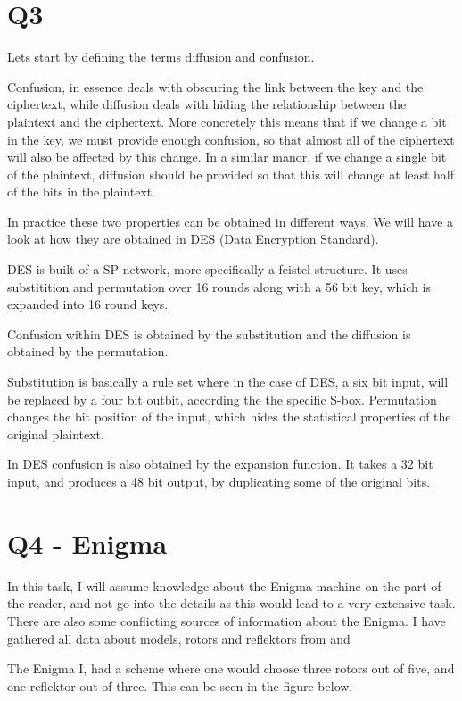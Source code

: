 \documentclass{article}
\begin{document}
\section{Q3}
Lets start by defining the terms diffusion and confusion.

Confusion, in essence deals with obscuring the link between the key and the ciphertext, while diffusion deals with hiding the relationship between the plaintext and the ciphertext. More concretely this means that if we change a bit in the key, we must provide enough confusion, so that almost all of the ciphertext will also be affected by this change. In a similar manor, if we change a single bit of the plaintext, diffusion should be provided so that this will change at least half of the bits in the plaintext. 

In practice these two properties can be obtained in different ways. We will have a look at how they are obtained in DES (Data Encryption Standard). 

DES is built of a SP-network, more specifically a feistel structure. It uses substitition and permutation over 16 rounds along with a 56 bit key, which is expanded into 16 round keys. 

Confusion within DES is obtained by the substitution and the diffusion is obtained by the permutation. 

Substitution is basically a rule set where in the case of DES, a six bit input, will be replaced by a four bit outbit, according the the specific S-box.
Permutation changes the bit position of the input, which hides the statistical properties of the original plaintext. 

In DES confusion is also obtained by the expansion function. It takes a 32 bit input, and produces a 48 bit output, by duplicating some of the original bits. 


\section{Q4 - Enigma}

In this task, I will assume knowledge about the Enigma machine on the part of the reader, and not go into the details as this would lead to a very extensive task. There are also some conflicting sources of information about the Enigma. I have gathered all data about models, rotors and reflektors from \cite{ENIGMA1} and \cite{ENIGMA2}

The Enigma I, had a scheme where one would choose three rotors out of five, and one reflektor out of three. This can be seen in the figure below. 
\end{document}
